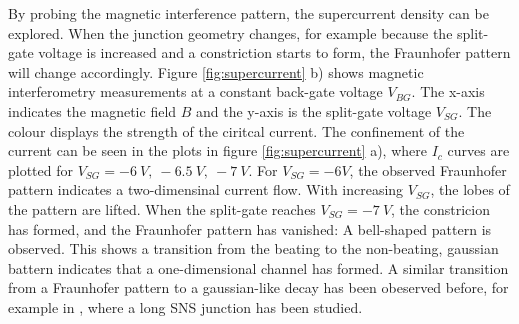 By probing the magnetic interference pattern, the supercurrent density can be explored. When the junction geometry changes, for example because the split-gate voltage is increased and a constriction starts to form, the Fraunhofer pattern will change accordingly. Figure \ref{fig:supercurrent} b) shows magnetic interferometry measurements at a constant back-gate voltage $V_{BG}$. The x-axis indicates the magnetic field $B$ and the y-axis is the split-gate voltage $V_{SG}$. The colour displays the strength of the ciritcal current. The confinement of the current can be seen in the plots in figure \ref{fig:supercurrent} a), where $I_c$ curves are plotted for $V_{SG} = -6\ V,\ -6.5\ V,\ -7\ V$. For $V_{SG} = -6 V$, the observed Fraunhofer pattern indicates a two-dimensinal current flow. With increasing $V_{SG}$, the lobes of the pattern are lifted. When the split-gate reaches $V_{SG} = -7\ V$, the constricion has formed, and the Fraunhofer pattern has vanished: A bell-shaped pattern is observed. This shows a transition from the beating to the non-beating, gaussian battern indicates that a one-dimensional channel has formed. A similar transition from a Fraunhofer pattern to a gaussian-like decay has been obeserved before, for example in \cite{Chiodi2012}, where a long SNS junction has been studied.
